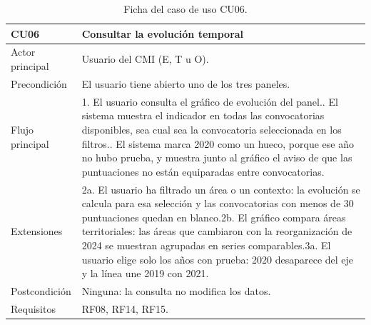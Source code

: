 \documentclass[12pt, a4paper, oneside]{report}
\begin{document}
\begin{table}[!tbp]
\centering
\small
{}\renewcommand{\arraystretch}{1.1}
\begin{tabularx}{\textwidth}{@{} >{\raggedright\arraybackslash}p{2.8cm} X @{}}
\toprule
\textbf{CU06} & \textbf{Consultar la evolución temporal} \\ \midrule
Actor principal & Usuario del CMI (E, T u O). \\ \addlinespace
Precondición & El usuario tiene abierto uno de los tres paneles. \\ \addlinespace
Flujo principal & 1. El usuario consulta el gráfico de evolución del panel.\newline 2. El sistema muestra el indicador en todas las convocatorias disponibles, sea cual sea la convocatoria seleccionada en los filtros.\newline 3. El sistema marca 2020 como un hueco, porque ese año no hubo prueba, y muestra junto al gráfico el aviso de que las puntuaciones no están equiparadas entre convocatorias. \\ \addlinespace
Extensiones & 2a. El usuario ha filtrado un área o un contexto: la evolución se calcula para esa selección y las convocatorias con menos de 30 puntuaciones quedan en blanco.\newline 2b. El gráfico compara áreas territoriales: las áreas que cambiaron con la reorganización de 2024 se muestran agrupadas en series comparables.\newline 3a. El usuario elige solo los años con prueba: 2020 desaparece del eje y la línea une 2019 con 2021. \\ \addlinespace
Postcondición & Ninguna: la consulta no modifica los datos. \\ \addlinespace
Requisitos & RF08, RF14, RF15. \\ \bottomrule
\end{tabularx}
\caption{Ficha del caso de uso CU06.}
\label{tab:cu06}
\end{table}
\end{document}
